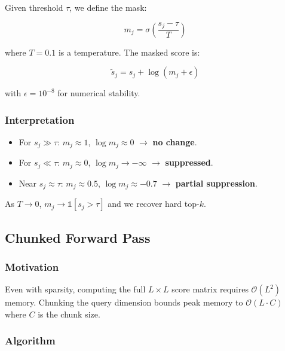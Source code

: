 Given threshold $\tau$, we define the mask:

\[
m_j = \sigma\!\left(\frac{s_j - \tau}{T}\right)
\]

where $T = 0.1$ is a temperature. The masked score is:

\[
\tilde{s}_j = s_j + \log(m_j + \epsilon)
\]

with $\epsilon = 10^{-8}$ for numerical stability.

\subsubsection{Interpretation}

\begin{itemize}
\item For $s_j \gg \tau$: $m_j \approx 1$, $\log m_j \approx 0$ $\to$ \textbf{no change}.
\item For $s_j \ll \tau$: $m_j \approx 0$, $\log m_j \to -\infty$ $\to$ \textbf{suppressed}.
\item Near $s_j \approx \tau$: $m_j \approx 0.5$, $\log m_j \approx -0.7$ $\to$ \textbf{partial suppression}.

\end{itemize}
As $T \to 0$, $m_j \to \mathbb{1}[s_j > \tau]$ and we recover hard top-$k$.

\subsection{Chunked Forward Pass}

\subsubsection{Motivation}

Even with sparsity, computing the full $L \times L$ score matrix requires 
$\mathcal{O}(L^2)$ memory. Chunking the query dimension bounds peak memory 
to $\mathcal{O}(L \cdot C)$ where $C$ is the chunk size.

\subsubsection{Algorithm}

